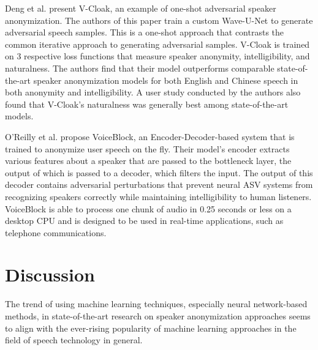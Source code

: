 \documentclass{Interspeech2024}
\begin{document}
Deng et al. \cite{deng_2023_v_cloak} present V-Cloak, an example of one-shot adversarial speaker anonymization. 
The authors of this paper train a custom Wave-U-Net to generate adversarial speech samples. 
This is a one-shot approach that contrasts the common iterative approach to generating adversarial samples. 
V-Cloak is trained on 3 respective loss functions that measure speaker anonymity, intelligibility, and naturalness. 
The authors find that their model outperforms comparable state-of-the-art speaker anonymization models for both English and Chinese speech in both anonymity and intelligibility. 
A user study conducted by the authors also found that V-Cloak's naturalness was generally best among state-of-the-art models.

O'Reilly et al. \cite{oreilly_2022_voiceblock} propose VoiceBlock, an Encoder-Decoder-based system that is trained to anonymize user speech on the fly. 
Their model's encoder extracts various features about a speaker that are passed to the bottleneck layer, the output of which is passed to a decoder, which filters the input.
The output of this decoder contains adversarial perturbations that prevent neural ASV systems from recognizing speakers correctly while maintaining intelligibility to human listeners.
VoiceBlock is able to process one chunk of audio in 0.25 seconds or less on a desktop CPU and is designed to be used in real-time applications, such as telephone communications.


\section{Discussion}
The trend of using machine learning techniques, especially neural network-based methods, in state-of-the-art research on speaker anonymization approaches seems to align with the ever-rising popularity of machine learning approaches in the field of speech technology in general.
\end{document}
